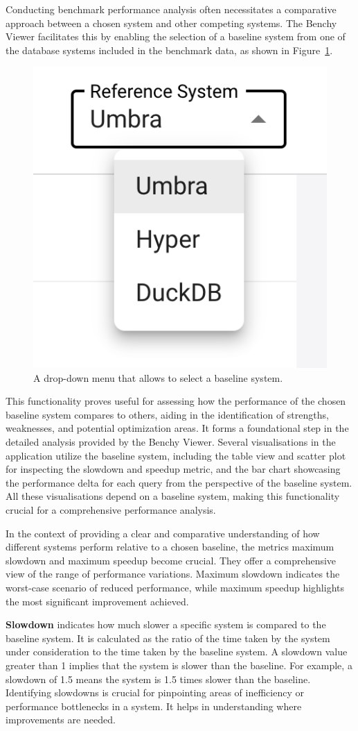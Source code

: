 Conducting benchmark performance analysis often necessitates a comparative approach between a chosen system and other competing systems. The Benchy Viewer facilitates this by enabling the selection of a baseline system from one of the database systems included in the benchmark data, as shown in Figure~\ref{fig:select-baseline-system}.

\begin{figure}[h]
  \centering
  \includegraphics[width=0.3\linewidth]{figures/select-baseline-system.png}
  \caption{A drop-down menu that allows to select a baseline system.}
  \label{fig:select-baseline-system}
\end{figure}


This functionality proves useful for assessing how the performance of the chosen baseline system compares to others, aiding in the identification of strengths, weaknesses, and potential optimization areas. It forms a foundational step in the detailed analysis provided by the Benchy Viewer. Several visualisations in the application utilize the baseline system, including the table view and scatter plot for inspecting the slowdown and speedup metric, and the bar chart showcasing the performance delta for each query from the perspective of the baseline system. All these visualisations depend on a baseline system, making this functionality crucial for a comprehensive performance analysis.

In the context of providing a clear and comparative understanding of how different systems perform relative to a chosen baseline, the metrics maximum slowdown and maximum speedup become crucial. They offer a comprehensive view of the range of performance variations. Maximum slowdown indicates the worst-case scenario of reduced performance, while maximum speedup highlights the most significant improvement achieved.

\textbf{Slowdown} indicates how much slower a specific system is compared to the baseline system. It is calculated as the ratio of the time taken by the system under consideration to the time taken by the baseline system. A slowdown value greater than 1 implies that the system is slower than the baseline. For example, a slowdown of 1.5 means the system is 1.5 times slower than the baseline.\\
Identifying slowdowns is crucial for pinpointing areas of inefficiency or performance bottlenecks in a system. It helps in understanding where improvements are needed.

